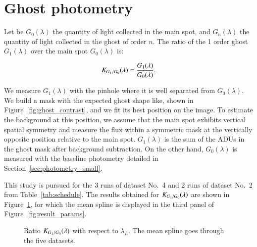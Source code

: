 \appendix

\section{Ghost photometry}
\label{sec:ghost_photometry}

Let be $G_0(\lambda)$ the quantity of light collected in the main spot, and $G_\mathrm{n}(\lambda)$ the quantity of light collected in the ghost of order $n$. The ratio of the 1 order ghost $G_1(\lambda)$ over the main spot $G_0(\lambda)$ is:

\begin{equation}
    K_{G_1/G_0}(\lambda) = \frac{G_1(\lambda)}{G_0(\lambda)}.
    \label{eq:ratio_ghost}
\end{equation}

We measure $G_1(\lambda)$ with the \spinhole pinhole where it is well separated from $G_0(\lambda)$. We build a mask with the expected ghost shape like, shown in Figure~\ref{fig:ghost_contrast}, and we fit its best position on the image. To estimate the background at this position, we assume that the main spot exhibits vertical spatial symmetry and measure the flux within a symmetric mask at the vertically opposite position relative to the main spot. $G_1(\lambda)$ is the sum of the ADUs in the ghost mask after background subtraction. On the other hand, $G_0(\lambda)$ is measured with the baseline photometry detailed in Section~\ref{sec:photometry_small}. 

This study is pursued for the 3 runs of dataset No.~4 and 2 runs of dataset No.~2 from Table~\ref{tab:schedule}. The results obtained for $K_{G_1/G_0}(\lambda)$ are shown in Figure~\ref{fig:ghost_ratio}, for which the mean spline is displayed in the third panel of Figure~\ref{fig:result_params}.

\begin{figure}[h]
     \centering
     \caption{Ratio $K_{G_1/G_0}(\lambda)$ with respect to $\lambda_L$. The mean spline goes through the five datasets.}
     \label{fig:ghost_ratio}
\end{figure}

